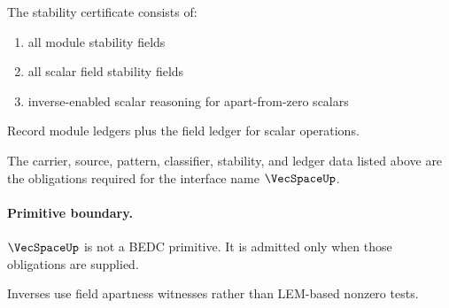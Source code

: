 \begin{definition}
\label{def:vecspace-stability-certificate}
The stability certificate consists of:
\begin{enumerate}
  \item all module stability fields
  \item all scalar field stability fields
  \item inverse-enabled scalar reasoning for apart-from-zero scalars
\end{enumerate}
\end{definition}

\begin{definition}
\label{def:vecspace-ledger-policy}
Record module ledgers plus the field ledger for scalar operations.
\end{definition}

\begin{definition}
\label{def:vecspace-certificate-obligations}
The carrier, source, pattern, classifier, stability, and ledger data listed above are the obligations required for the interface name \(\VecSpaceUp\).
\end{definition}

\paragraph{Primitive boundary.}
\(\VecSpaceUp\) is not a BEDC primitive. It is admitted only when those obligations are supplied.

\begin{remark}
\label{rem:vecspace-zero-axiom-note}
Inverses use field apartness witnesses rather than LEM-based nonzero tests.
\end{remark}

